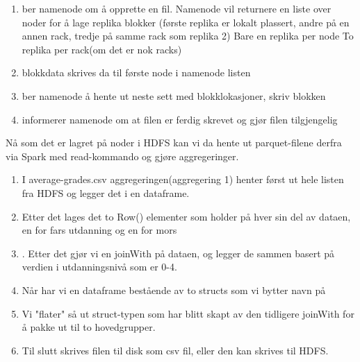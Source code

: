 \begin{enumerate}
    \item ber namenode om å opprette en fil. Namenode vil returnere en liste over noder for å lage replika blokker (første replika er lokalt plassert, andre på en annen rack, tredje på samme rack som replika 2)
    \subitem Bare en replika per node 
    \subitem To replika per rack(om det er nok racks)
    \item blokkdata skrives da til første node i namenode listen
    \item ber namenode å hente ut neste sett med blokklokasjoner, skriv blokken
    \item informerer namenode om at filen er ferdig skrevet og gjør filen tilgjengelig
  \end{enumerate}


Nå som det er lagret på noder i HDFS kan vi da hente ut parquet-filene derfra via Spark med read-kommando og gjøre aggregeringer.

\begin{enumerate}
    \item I average-grades.csv aggregeringen(aggregering 1) henter først ut hele listen fra HDFS og legger det i en dataframe.
    \item Etter det lages det to Row() elementer som holder på hver sin del av dataen, en for fars utdanning og en for mors
    \item . Etter det gjør vi en joinWith på dataen, og legger de sammen basert på verdien i utdanningsnivå som er 0-4.
    \item Når har vi en dataframe bestående av to structs som vi bytter navn på
    \item Vi "flater" så ut struct-typen som har blitt skapt av den tidligere joinWith for å pakke ut til to hovedgrupper.
    \item Til slutt skrives filen til disk som csv fil, eller den kan skrives til HDFS.
  \end{enumerate}

